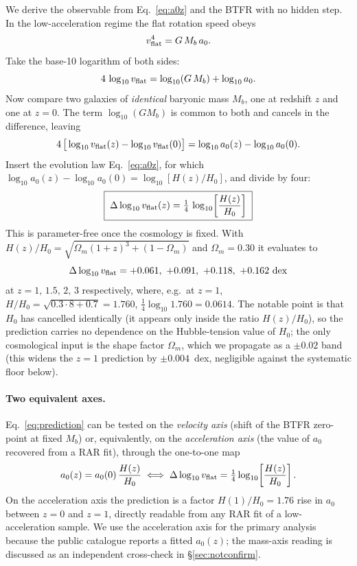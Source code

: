 \documentclass[fleqn,usenatbib]{mnras}
\newcommand{\dlogv}{\Delta\log_{10} v_{\rm flat}}
\newcommand{\azero}{a_0}
\begin{document}
We derive the observable from Eq.~\eqref{eq:a0z} and the BTFR with no hidden step.
In the low-acceleration regime the flat rotation speed obeys
\begin{equation}
v_{\rm flat}^4 = G\,M_b\,\azero .
\label{eq:btfr}
\end{equation}
Take the base-10 logarithm of both sides:
\begin{equation}
4\,\log_{10} v_{\rm flat} = \log_{10}(G\,M_b) + \log_{10}\azero .
\label{eq:logbtfr}
\end{equation}
Now compare two galaxies of \emph{identical} baryonic mass $M_b$, one at redshift
$z$ and one at $z=0$. The term $\log_{10}(GM_b)$ is common to both and cancels in
the difference, leaving
\begin{equation}
4\,\big[\log_{10} v_{\rm flat}(z)-\log_{10}v_{\rm flat}(0)\big]
= \log_{10}\azero(z)-\log_{10}\azero(0).
\label{eq:diff}
\end{equation}
Insert the evolution law Eq.~\eqref{eq:a0z}, for which
$\log_{10}\azero(z)-\log_{10}\azero(0)=\log_{10}[H(z)/H_0]$, and divide by four:
\begin{equation}
\boxed{\;\dlogv(z)=\tfrac14\,\log_{10}\!\left[\frac{H(z)}{H_0}\right]\;}
\label{eq:prediction}
\end{equation}
This is parameter-free once the cosmology is fixed. With
$H(z)/H_0=\sqrt{\Omega_m(1+z)^3+(1-\Omega_m)}$ and $\Omega_m=0.30$ it evaluates to
\begin{equation}
\dlogv = +0.061,\ +0.091,\ +0.118,\ +0.162~{\rm dex}
\label{eq:numbers}
\end{equation}
at $z=1,\,1.5,\,2,\,3$ respectively, where, e.g.\ at $z=1$,
$H/H_0=\sqrt{0.3\cdot8+0.7}=1.760$,
$\tfrac14\log_{10}1.760=0.0614$. The notable point is that $H_0$ has cancelled
identically (it appears only inside the ratio $H(z)/H_0$), so the prediction carries
no dependence on the Hubble-tension value of $H_0$; the only cosmological input is
the shape factor $\Omega_m$, which we propagate as a $\pm0.02$ band (this widens the
$z=1$ prediction by $\pm0.004$~dex, negligible against the systematic floor below).

\paragraph{Two equivalent axes.} Eq.~\eqref{eq:prediction} can be tested on the
\emph{velocity axis} (shift of the BTFR zero-point at fixed $M_b$) or, equivalently,
on the \emph{acceleration axis} (the value of $\azero$ recovered from a RAR fit),
through the one-to-one map
\begin{equation}
\azero(z)=\azero(0)\,\frac{H(z)}{H_0}
\;\Longleftrightarrow\;
\dlogv=\tfrac14\log_{10}\!\left[\frac{H(z)}{H_0}\right].
\label{eq:equiv}
\end{equation}
On the acceleration axis the prediction is a factor $H(1)/H_0=1.76$ rise in $\azero$
between $z=0$ and $z=1$, directly readable from any RAR fit of a low-acceleration
sample. We use the acceleration axis for the primary analysis because the public
catalogue reports a fitted $\azero(z)$; the mass-axis reading is discussed as an
independent cross-check in \S\ref{sec:notconfirm}.
\end{document}
